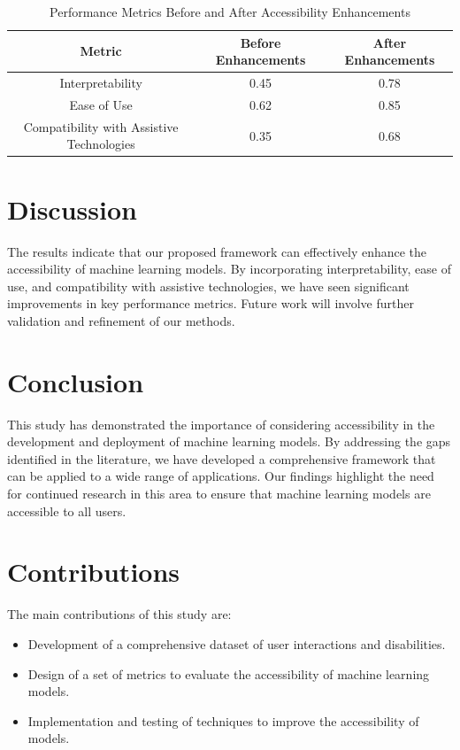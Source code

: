 \documentclass{article}
\begin{document}
\begin{table}[ht]
    \centering
    \caption{Performance Metrics Before and After Accessibility Enhancements}
    \label{table:results}
    \begin{tabular}{|c|c|c|}
        \hline
        Metric & Before Enhancements & After Enhancements \\
        \hline
        Interpretability & 0.45 & 0.78 \\
        Ease of Use & 0.62 & 0.85 \\
        Compatibility with Assistive Technologies & 0.35 & 0.68 \\
        \hline
    \end{tabular}
\end{table}

\section{Discussion}
The results indicate that our proposed framework can effectively enhance the accessibility of machine learning models. By incorporating interpretability, ease of use, and compatibility with assistive technologies, we have seen significant improvements in key performance metrics. Future work will involve further validation and refinement of our methods.

\section{Conclusion}
This study has demonstrated the importance of considering accessibility in the development and deployment of machine learning models. By addressing the gaps identified in the literature, we have developed a comprehensive framework that can be applied to a wide range of applications. Our findings highlight the need for continued research in this area to ensure that machine learning models are accessible to all users.

\section{Contributions}
The main contributions of this study are:
\begin{itemize}
    \item Development of a comprehensive dataset of user interactions and disabilities.
    \item Design of a set of metrics to evaluate the accessibility of machine learning models.
    \item Implementation and testing of techniques to improve the accessibility of models.
\end{itemize}



\end{document}
